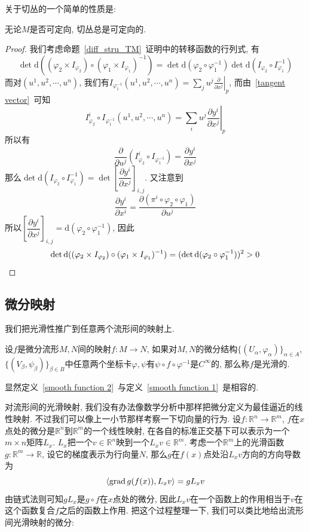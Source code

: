 关于切丛的一个简单的性质是:
\begin{prop}
    无论$M$是否可定向, 切丛总是可定向的.
\end{prop}
\begin{proof}
    我们考虑命题~\ref{diff_stru_TM}~证明中的转移函数的行列式, 有
    \[\det\mathrm{d}((\varphi_2\times I_{\varphi_2})\circ(\varphi_1\times I_{\varphi_1})^{-1})=\det\mathrm{d}(\varphi_2\circ\varphi_1^{-1})\det\mathrm{d}(I_{\varphi_2}\circ I_{\varphi_1}^{-1})\]
    而对$(u^1,u^2,\cdots,u^n)$, 我们有$\displaystyle I_{\varphi_1^{-1}}(u^1,u^2,\cdots,u^n)=\left.\sum_{j}u^j\frac{\partial}{\partial x^j}\right|_p$, 而由~\eqref{tangent vector}~可知
    \[\displaystyle I_{\varphi_2}^i\circ I_{\varphi_1^{-1}}(u^1,u^2,\cdots,u^n)=\left.\sum_{i}u^j\frac{\partial y^i}{\partial x^j}\right|_p\]
    所以有
    \[\frac{\partial}{\partial u^j}(I_{\varphi_2}^i\circ I_{\varphi_1^{-1}})=\frac{\partial y^i}{\partial x^j}\]
    那么$\det\mathrm{d}(I_{\varphi_2}\circ I_{\varphi_1}^{-1})=\det\left[\dfrac{\partial y^i}{\partial x^j}\right]_{i,j}$.
    又注意到
    \[\frac{\partial y^i}{\partial x^i}=\frac{\partial(\pi^i\circ\varphi_2\circ\varphi_1)}{\partial u^j}\]
    所以$\left[\dfrac{\partial y^i}{\partial x^j}\right]_{i,j}=\mathrm{d}(\varphi_2\circ\varphi_1^{-1})$, 因此
    \[\det\mathrm{d}((\varphi_2\times I_{\varphi_2})\circ(\varphi_1\times I_{\varphi_1})^{-1})=(\det\mathrm{d}(\varphi_2\circ\varphi_1^{-1}))^2>0\qedhere\]
\end{proof}

\subsection*{微分映射}

我们把光滑性推广到任意两个流形间的映射上.

\begin{defn}\label{smooth function 2}
    设$f$是微分流形$M,N$间的映射$f:M\to N$, 如果对$M,N$的微分结构$\{(U_\alpha,\varphi_\alpha)\}_{\alpha\in A}$, $\{(V_\beta,\psi_\beta)\}_{\beta\in B}$中任意两个坐标卡$\varphi,\psi$有$\psi\circ f\circ\varphi^{-1}$是$C^\infty$的, 那么称$f$是光滑的.
\end{defn}

显然定义~\ref{smooth function 2}~与定义~\ref{smooth function 1}~是相容的.

对流形间的光滑映射, 我们没有办法像数学分析中那样把微分定义为最佳逼近的线性映射.
不过我们可以像上一小节那样考察一下切向量的行为.
设$f:\mathbb{R}^n\to\mathbb{R}^m$, $f$在$x$点处的微分是$\mathbb{R}^n$到$\mathbb{R}^m$的一个线性映射, 在各自的标准正交基下可以表示为一个$m\times n$矩阵$L_x$.
$L_x$把一个$v\in\mathbb{R}^n$映到一个$L_xv\in\mathbb{R}^m$.
考虑一个$\mathbb{R}^m$上的光滑函数$g:\mathbb{R}^m\to\mathbb{R}$, 设它的梯度表示为行向量$N$, 那么$g$在$f(x)$点处沿$L_xv$方向的方向导数为
\[\langle\operatorname*{grad}{g(f(x))},L_xv\rangle=gL_xv\]
由链式法则可知$gL_x$是$g\circ f$在$x$点处的微分, 因此$L_xv$在一个函数上的作用相当于$v$在这个函数复合$f$之后的函数上作用.
把这个过程整理一下, 我们可以类比地给出流形间光滑映射的微分:


